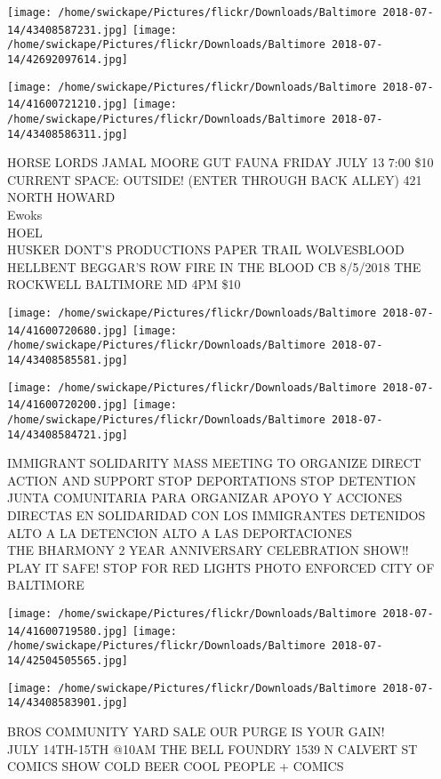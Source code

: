 \documentclass[10pt,letterpaper]{article}
\begin{document}
\texttt{[image: /home/swickape/Pictures/flickr/Downloads/Baltimore 2018-07-14/43408587231.jpg]}
\texttt{[image: /home/swickape/Pictures/flickr/Downloads/Baltimore 2018-07-14/42692097614.jpg]}

\texttt{[image: /home/swickape/Pictures/flickr/Downloads/Baltimore 2018-07-14/41600721210.jpg]}
\texttt{[image: /home/swickape/Pictures/flickr/Downloads/Baltimore 2018-07-14/43408586311.jpg]}

HORSE LORDS JAMAL MOORE GUT FAUNA FRIDAY JULY 13 7:00 \$10 CURRENT SPACE: OUTSIDE!  (ENTER THROUGH BACK ALLEY) 421 NORTH HOWARD\\
Ewoks\\
HOEL\\
HUSKER DONT'S PRODUCTIONS PAPER TRAIL WOLVESBLOOD HELLBENT BEGGAR'S ROW FIRE IN THE BLOOD CB 8/5/2018 THE ROCKWELL BALTIMORE MD 4PM \$10\\
\pagebreak

\texttt{[image: /home/swickape/Pictures/flickr/Downloads/Baltimore 2018-07-14/41600720680.jpg]}
\texttt{[image: /home/swickape/Pictures/flickr/Downloads/Baltimore 2018-07-14/43408585581.jpg]}

\texttt{[image: /home/swickape/Pictures/flickr/Downloads/Baltimore 2018-07-14/41600720200.jpg]}
\texttt{[image: /home/swickape/Pictures/flickr/Downloads/Baltimore 2018-07-14/43408584721.jpg]}

IMMIGRANT SOLIDARITY MASS MEETING TO ORGANIZE DIRECT ACTION AND SUPPORT STOP DEPORTATIONS STOP DETENTION\\
JUNTA COMUNITARIA PARA ORGANIZAR APOYO Y ACCIONES DIRECTAS EN SOLIDARIDAD CON LOS IMMIGRANTES DETENIDOS ALTO A LA DETENCION ALTO A LAS DEPORTACIONES\\
THE BHARMONY 2 YEAR ANNIVERSARY CELEBRATION SHOW!!\\
PLAY IT SAFE!  STOP FOR RED LIGHTS PHOTO ENFORCED CITY OF BALTIMORE\\
\pagebreak

\texttt{[image: /home/swickape/Pictures/flickr/Downloads/Baltimore 2018-07-14/41600719580.jpg]}
\texttt{[image: /home/swickape/Pictures/flickr/Downloads/Baltimore 2018-07-14/42504505565.jpg]}

\texttt{[image: /home/swickape/Pictures/flickr/Downloads/Baltimore 2018-07-14/43408583901.jpg]}

BROS COMMUNITY YARD SALE OUR PURGE IS YOUR GAIN!\\
JULY 14TH{-}15TH @10AM THE BELL FOUNDRY 1539 N CALVERT ST\\
COMICS SHOW COLD BEER COOL PEOPLE + COMICS\\
\pagebreak
\end{document}
